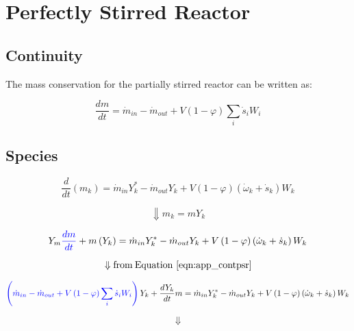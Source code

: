 \section{Perfectly Stirred Reactor}
\label{sec:derivpsr}

\subsection{Continuity}
The mass conservation for the partially stirred reactor can be written as:

\begin{equation}
	\frac{dm}{dt}={\dot{m}}_{in}-{\dot{m}}_{out}+V\left(1-\varphi\right)\sum_{i}{{\dot{s}}_iW_i}
	\label{eqn:app_contpsr}
\end{equation}

\subsection{Species}


\begin{equation*}
	\frac{d}{dt}\left(m_k\right)={\dot{m}}_{in}Y_k^\ast-{\dot{m}}_{out}Y_k+V\left(1-\varphi\right)\left({\dot{\omega}}_k+{\dot{s}}_k\right)W_k
\end{equation*}

\begin{equation*}
	\Downarrow m_k=mY_k
\end{equation*}


\begin{equation*}
	Y_m
	\color{blue}
	\frac{dm}{dt}
	\color{black}
	+
	m\left(Y_k\right)
	=
	{\dot{m}}_{in}Y_k^\ast-{\dot{m}}_{out}Y_k+V\left(1-\varphi\right)\left({\dot{\omega}}_k+{\dot{s}}_k\right)W_k
\end{equation*}

\begin{equation*}
	\Downarrow \mathrm{from \: Equation~\ref{eqn:app_contpsr}}
\end{equation*}


\begin{equation*}
	\color{blue}
	\left(
		{\dot{m}}_{in}
		-
		{\dot{m}}_{out}
		+V\left(1-\varphi\right)\sum_{i}{{\dot{s}}_iW_i}
	\right)
	\color{black}
	Y_k+\frac{dY_k}{dt}m={\dot{m}}_{in}Y_k^\ast-{\dot{m}}_{out}Y_k+V\left(1-\varphi\right)\left({\dot{\omega}}_k+{\dot{s}}_k\right)W_k
\end{equation*}

 \begin{equation*}
 	\Downarrow
 \end{equation*}


